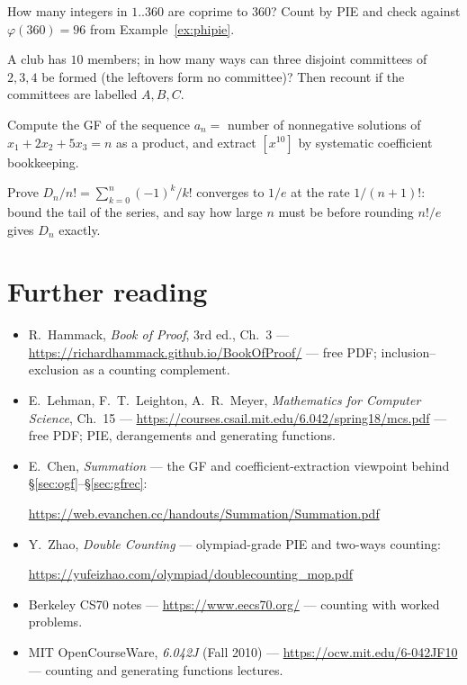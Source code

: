 \begin{exercise}[easy]
How many integers in $1..360$ are coprime to $360$? Count by PIE and
check against $\varphi(360) = 96$ from Example~\ref{ex:phipie}.
\end{exercise}
\begin{exercise}[medium]
A club has $10$ members; in how many ways can three disjoint committees
of $2, 3, 4$ be formed (the leftovers form no committee)? Then recount
if the committees are labelled $A, B, C$.
\end{exercise}
\begin{exercise}[medium]
Compute the GF of the sequence $a_n = $ number of nonnegative solutions
of $x_1 + 2x_2 + 5x_3 = n$ as a product, and extract $[x^{10}]$ by
systematic coefficient bookkeeping.
\end{exercise}
\begin{exercise}[hard]
Prove $D_n/n! = \sum_{k=0}^n (-1)^k/k!$ converges to $1/e$ at the rate
$1/(n{+}1)!$: bound the tail of the series, and say how large $n$ must
be before rounding $n!/e$ gives $D_n$ exactly.
\end{exercise}

\section*{Further reading}
\begin{itemize}
\item R.~Hammack, \emph{Book of Proof}, 3rd ed., Ch.~3 ---
\url{https://richardhammack.github.io/BookOfProof/} --- free PDF;
inclusion--exclusion as a counting complement.
\item E.~Lehman, F.~T.~Leighton, A.~R.~Meyer, \emph{Mathematics for
Computer Science}, Ch.~15 ---
\url{https://courses.csail.mit.edu/6.042/spring18/mcs.pdf} --- free PDF;
PIE, derangements and generating functions.
\item E.~Chen, \emph{Summation} --- the GF and coefficient-extraction
viewpoint behind \S\ref{sec:ogf}--\S\ref{sec:gfrec}:

\url{https://web.evanchen.cc/handouts/Summation/Summation.pdf}
\item Y.~Zhao, \emph{Double Counting} --- olympiad-grade PIE and
two-ways counting:

\url{https://yufeizhao.com/olympiad/doublecounting_mop.pdf}
\item Berkeley CS70 notes ---
\url{https://www.eecs70.org/} --- counting with worked problems.
\item MIT OpenCourseWare, \emph{6.042J} (Fall 2010) ---
\url{https://ocw.mit.edu/6-042JF10} --- counting and generating
functions lectures.
\end{itemize}

